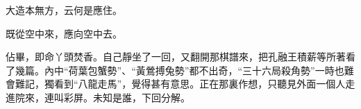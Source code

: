 \begin{poem}
    \begin{pl}
        大造本無方，云何是應住。
    \end{pl}


    \begin{pl}
        既從空中來，應向空中去。
    \end{pl}
\end{poem}


\begin{parag}
    佔畢，即命丫頭焚香。自己靜坐了一回，又翻開那棋譜來，把孔融王積薪等所著看了幾篇。內中“荷葉包蟹勢”、“黃鶯搏兔勢”都不出奇，“三十六局殺角勢”一時也難會難記，獨看到“八龍走馬”，覺得甚有意思。正在那裏作想，只聽見外面一個人走進院來，連叫彩屏。未知是誰，下回分解。
\end{parag}